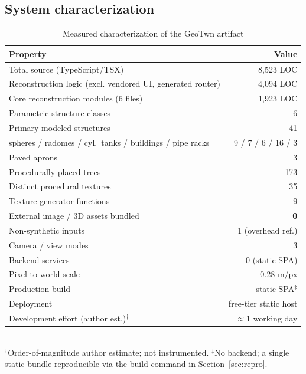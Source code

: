 \documentclass[conference]{IEEEtran}
\begin{document}
\subsection{System characterization}
\begin{table}[t]
\caption{Measured characterization of the GeoTwn artifact}
\label{tab:sysvals}
\centering
\renewcommand{\arraystretch}{1.05}
\begin{tabular}{@{}lr@{}}
\toprule
\textbf{Property} & \textbf{Value} \\
\midrule
Total source (TypeScript/TSX)                 & 8{,}523 LOC \\
Reconstruction logic (excl. vendored UI, generated router) & 4{,}094 LOC \\
Core reconstruction modules (6 files)         & 1{,}923 LOC \\
Parametric structure classes                  & 6 \\
Primary modeled structures                    & 41 \\
\;\; spheres / radomes / cyl.\ tanks / buildings / pipe racks & 9 / 7 / 6 / 16 / 3 \\
Paved aprons                                   & 3 \\
Procedurally placed trees                      & 173 \\
Distinct procedural textures                   & 35 \\
Texture generator functions                    & 9 \\
External image / 3D assets bundled             & \textbf{0} \\
Non-synthetic inputs                           & 1 (overhead ref.) \\
Camera / view modes                            & 3 \\
Backend services                               & 0 (static SPA) \\
Pixel-to-world scale                           & 0.28 m/px \\
Production build                               & static SPA$^{\ddagger}$ \\
Deployment                                     & free-tier static host \\
Development effort (author est.)$^{\dagger}$    & $\approx$1 working day \\
\bottomrule
\end{tabular}
\\[2pt]
{\footnotesize $^{\dagger}$Order-of-magnitude author estimate; not instrumented.
$^{\ddagger}$No backend; a single static bundle reproducible via the build command
in Section~\ref{sec:repro}.}
\end{table}
\end{document}
